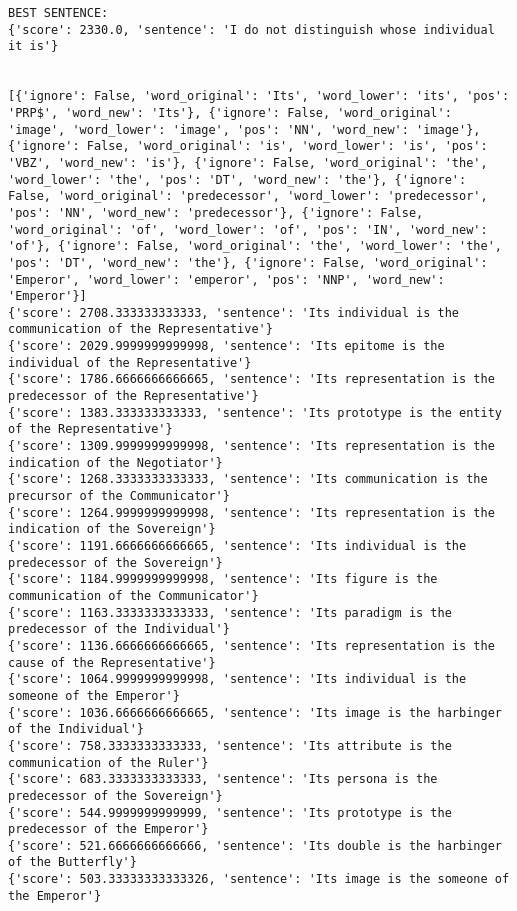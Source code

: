 \documentclass[12pt,a4paper,oneside]{book}
\begin{document}
\begin{verbatim}
BEST SENTENCE:
{'score': 2330.0, 'sentence': 'I do not distinguish whose individual it is'}


[{'ignore': False, 'word_original': 'Its', 'word_lower': 'its', 'pos': 'PRP$', 'word_new': 'Its'}, {'ignore': False, 'word_original': 'image', 'word_lower': 'image', 'pos': 'NN', 'word_new': 'image'}, {'ignore': False, 'word_original': 'is', 'word_lower': 'is', 'pos': 'VBZ', 'word_new': 'is'}, {'ignore': False, 'word_original': 'the', 'word_lower': 'the', 'pos': 'DT', 'word_new': 'the'}, {'ignore': False, 'word_original': 'predecessor', 'word_lower': 'predecessor', 'pos': 'NN', 'word_new': 'predecessor'}, {'ignore': False, 'word_original': 'of', 'word_lower': 'of', 'pos': 'IN', 'word_new': 'of'}, {'ignore': False, 'word_original': 'the', 'word_lower': 'the', 'pos': 'DT', 'word_new': 'the'}, {'ignore': False, 'word_original': 'Emperor', 'word_lower': 'emperor', 'pos': 'NNP', 'word_new': 'Emperor'}]
{'score': 2708.333333333333, 'sentence': 'Its individual is the communication of the Representative'}
{'score': 2029.9999999999998, 'sentence': 'Its epitome is the individual of the Representative'}
{'score': 1786.6666666666665, 'sentence': 'Its representation is the predecessor of the Representative'}
{'score': 1383.333333333333, 'sentence': 'Its prototype is the entity of the Representative'}
{'score': 1309.9999999999998, 'sentence': 'Its representation is the indication of the Negotiator'}
{'score': 1268.3333333333333, 'sentence': 'Its communication is the precursor of the Communicator'}
{'score': 1264.9999999999998, 'sentence': 'Its representation is the indication of the Sovereign'}
{'score': 1191.6666666666665, 'sentence': 'Its individual is the predecessor of the Sovereign'}
{'score': 1184.9999999999998, 'sentence': 'Its figure is the communication of the Communicator'}
{'score': 1163.3333333333333, 'sentence': 'Its paradigm is the predecessor of the Individual'}
{'score': 1136.6666666666665, 'sentence': 'Its representation is the cause of the Representative'}
{'score': 1064.9999999999998, 'sentence': 'Its individual is the someone of the Emperor'}
{'score': 1036.6666666666665, 'sentence': 'Its image is the harbinger of the Individual'}
{'score': 758.3333333333333, 'sentence': 'Its attribute is the communication of the Ruler'}
{'score': 683.3333333333333, 'sentence': 'Its persona is the predecessor of the Sovereign'}
{'score': 544.9999999999999, 'sentence': 'Its prototype is the predecessor of the Emperor'}
{'score': 521.6666666666666, 'sentence': 'Its double is the harbinger of the Butterfly'}
{'score': 503.33333333333326, 'sentence': 'Its image is the someone of the Emperor'}

\end{verbatim}
\end{document}
